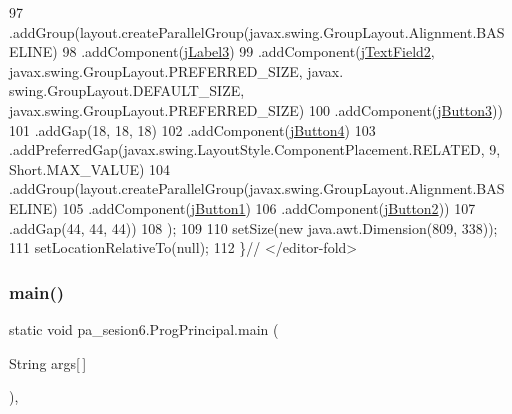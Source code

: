 \begin{DoxyCode}
97                 .addGroup(layout.createParallelGroup(javax.swing.GroupLayout.Alignment.BASELINE)
98                     .addComponent(\mbox{\hyperlink{classpa__sesion6_1_1_prog_principal_a4531dd28f71269d0ecd682e0c8f6cc2e}{jLabel3}})
99                     .addComponent(\mbox{\hyperlink{classpa__sesion6_1_1_prog_principal_a0381b47538147a043d91431e3cb981dc}{jTextField2}}, javax.swing.GroupLayout.PREFERRED\_SIZE, javax.
      swing.GroupLayout.DEFAULT\_SIZE, javax.swing.GroupLayout.PREFERRED\_SIZE)
100                     .addComponent(\mbox{\hyperlink{classpa__sesion6_1_1_prog_principal_ab47a77238e53b4e0e6d1d5cd5d83620d}{jButton3}}))
101                 .addGap(18, 18, 18)
102                 .addComponent(\mbox{\hyperlink{classpa__sesion6_1_1_prog_principal_a9703d219be4d93bd1f6ed81cbfc1af61}{jButton4}})
103                 .addPreferredGap(javax.swing.LayoutStyle.ComponentPlacement.RELATED, 9, Short.MAX\_VALUE)
104                 .addGroup(layout.createParallelGroup(javax.swing.GroupLayout.Alignment.BASELINE)
105                     .addComponent(\mbox{\hyperlink{classpa__sesion6_1_1_prog_principal_ac3fa4d920e564a95291a07710b145455}{jButton1}})
106                     .addComponent(\mbox{\hyperlink{classpa__sesion6_1_1_prog_principal_a124fb4257898d5e460eed588be9d285c}{jButton2}}))
107                 .addGap(44, 44, 44))
108         );
109  
110         setSize(\textcolor{keyword}{new} java.awt.Dimension(809, 338));
111         setLocationRelativeTo(null);
112     \}\textcolor{comment}{// </editor-fold>                       }
\end{DoxyCode}
\mbox{\label{classpa__sesion6_1_1_prog_principal_a8406d27ef9ec50f44909481a6a4a7741}} 
\subsubsection{\texorpdfstring{main()}{main()}}
{\footnotesize\ttfamily static void pa\+\_\+sesion6.\+Prog\+Principal.\+main (\begin{DoxyParamCaption}\item[{String}]{args\mbox{[}$\,$\mbox{]} }\end{DoxyParamCaption})\hspace{0.3cm}{\ttfamily [inline]}, {\ttfamily [static]}}


